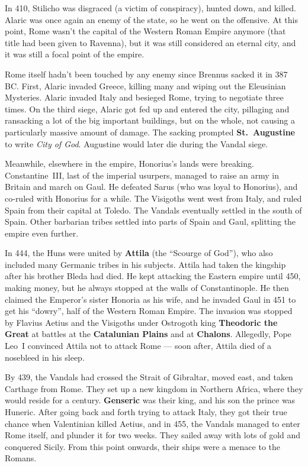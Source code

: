 In 410, Stilicho was disgraced (a victim of conspiracy), hunted down, and killed.
Alaric was once again an enemy of the state, so he went on the offensive.
At this point, Rome wasn't the capital of the Western Roman Empire anymore
(that title had been given to Ravenna),
but it was still considered an eternal city, and it was still a focal point of the empire.

Rome itself hadn't been touched by any enemy since Brennus sacked it in 387 BC\@.
First, Alaric invaded Greece, killing many and wiping out the Eleusinian Mysteries.
Alaric invaded Italy and besieged Rome, trying to negotiate three times.
On the third siege, Alaric got fed up and entered the city,
pillaging and ransacking a lot of the big important buildings,
but on the whole, not causing a particularly massive amount of damage.
The sacking prompted \textbf{St.\ Augustine} to write \textit{City of God}.
Augustine would later die during the Vandal siege.

Meanwhile, elsewhere in the empire, Honorius's lands were breaking.
Constantine~III, last of the imperial usurpers, managed to raise an army in Britain and march on Gaul.
He defeated Sarus (who was loyal to Honorius), and co-ruled with Honorius for a while.
The Visigoths went west from Italy, and ruled Spain from their capital at Toledo.
The Vandals eventually settled in the south of Spain.
Other barbarian tribes settled into parts of Spain and Gaul, splitting the empire even further.

In 444, the Huns were united by \textbf{Attila} (the ``Scourge of God''),
who also included many Germanic tribes in his subjects.
Attila had taken the kingship after his brother Bleda had died.
He kept attacking the Eastern empire until 450, making money,
but he always stopped at the walls of Constantinople.
He then claimed the Emperor's sister Honoria as his wife,
and he invaded Gaul in 451 to get his ``dowry'', half of the Western Roman Empire.
The invasion was stopped by Flavius Aetius and the Visigoths under Ostrogoth king \textbf{Theodoric the Great}
at battles at the \textbf{Catalunian Plains} and at \textbf{Chalons}.
Allegedly, Pope Leo~I convinced Attila not to attack Rome ---
soon after, Attila died of a nosebleed in his sleep.

By 439, the Vandals had crossed the Strait of Gibraltar, moved east, and taken Carthage from Rome.
They set up a new kingdom in Northern Africa, where they would reside for a century.
\textbf{Genseric} was their king, and his son the prince was Huneric.
After going back and forth trying to attack Italy, they got their true chance when Valentinian killed Aetius,
and in 455, the Vandals managed to enter Rome itself, and plunder it for two weeks.
They sailed away with lots of gold and conquered Sicily.
From this point onwards, their ships were a menace to the Romans.

